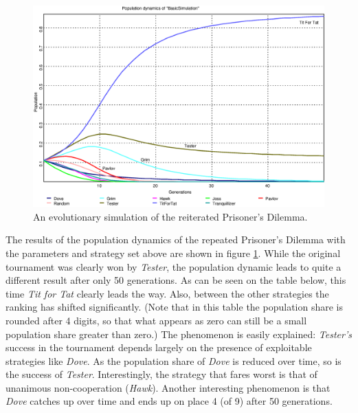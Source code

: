 \begin{figure}
\begin{center}
\includegraphics[width=20cm]{images/BasicSimulation_refined.eps}
\caption{\label{BasicSimulation} An evolutionary simulation of the
reiterated Prisoner's Dilemma.}
\end{center}
\end{figure}

The results of the population dynamics of the repeated Prisoner's Dilemma with
the parameters and strategy set above are shown in figure
\ref{BasicSimulation}. While the original tournament was clearly won by {\em
  Tester}, the population dynamic leads to quite a different result after
only 50 generations. As can be seen on the table below, this time {\em Tit for
  Tat} clearly leads the way. Also, between the other strategies the ranking
has shifted significantly. (Note that in this table the population share is
rounded after 4 digits, so that what appears as zero can still be a small
population share greater than zero.) The phenomenon is easily explained: {\em
  Tester's} success in the tournament depends largely on the presence of
exploitable strategies like {\em Dove}. As the population share of {\em Dove}
is reduced over time, so is the success of {\em Tester}.  Interestingly, the
strategy that fares worst is that of unanimous non-cooperation ({\em Hawk}).
Another interesting phenomenon is that {\em Dove} catches up over time and
ends up on place 4 (of 9) after 50 generations.

